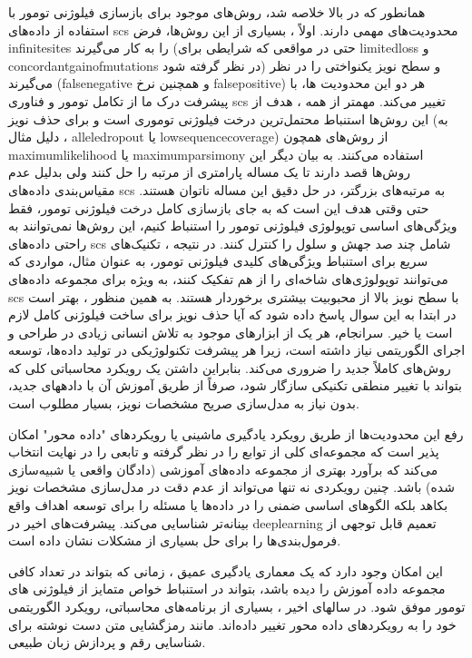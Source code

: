 همانطور که در بالا خلاصه شد، روش‌های موجود برای بازسازی فیلوژنی تومور با استفاده از داده‌های \gls{scs} محدودیت‌های مهمی دارند. اولاً ، بسیاری از این روش‌ها، فرض \gls{infinitesites} را به کار می‌گیرند (حتی در مواقعی که شرایطی برای \gls{limitedloss} و \gls{concordantgainofmutations}  در نظر گرفته شود) و سطح نویز یکنواختی را در نظر می‌گیرند (\gls{falsenegative} و همچنین نرخ \gls{falsepositive})  هر دو این محدودیت ها، با پیشرفت درک ما از تکامل تومور و فناوری \gls{scs}  تغییر می‌کند. مهمتر از همه ، هدف از این روش‌ها استنباط محتمل‌ترین درخت فیلوژنی توموری است و برای حذف نویز (به دلیل مثال ، \gls{alleledropout} یا \gls{lowsequencecoverage}) از روش‌های همچون \gls{maximumlikelihood} یا \gls{maximumparsimony} استفاده می‌کنند. به بیان دیگر این روش‌ها قصد دارند تا یک مساله پارامتری از مرتبه  را حل کنند ولی بدلیل  عدم مقیاس‌بندی داده‌های \gls{scs} به مرتبه‌های بزرگتر، در حل دقیق این مساله ناتوان هستند. حتی وقتی هدف این است که به جای بازسازی کامل درخت فیلوژنی تومور، فقط ویژگی‌های اساسی توپولوژی فیلوژنی تومور را استنباط کنیم، این روش‌ها نمی‌توانند به راحتی داده‌های \gls{scs} شامل چند صد جهش و سلول را کنترل کنند. در نتیجه ، تکنیک‌های سریع برای استنباط ویژگی‌های کلیدی فیلوژنی تومور، به عنوان مثال، مواردی که می‌توانند توپولوژی‌های شاخه‌ای را از هم تفکیک کنند، به ویژه برای مجموعه داده‌های \gls{scs} با سطح نویز بالا از محبوبیت بیشتری برخوردار هستند. به همین منظور ، بهتر است در ابتدا به این سوال پاسخ داده شود که آیا حذف نویز  برای ساخت فیلوژنی کامل لازم است یا خیر. سرانجام، هر یک از ابزارهای موجود به تلاش انسانی زیادی در طراحی و اجرای الگوریتمی نیاز داشته است، زیرا هر پیشرفت تکنولوژیکی در تولید داده‌ها، توسعه روش‌های کاملاً جدید را ضروری می‌کند. بنابراین داشتن یک رویکرد محاسباتی کلی که بتواند با تغییر منطقی تکنیکی سازگار شود، صرفاً از طریق آموزش آن با دادههای جدید، بدون نیاز به مدل‌سازی صریح مشخصات نویز، بسیار مطلوب است.


رفع این محدودیت‌ها از طریق رویکرد یادگیری ماشینی یا رویکردهای "داده محور" امکان پذیر است که مجموعه‌ای کلی از توابع را در نظر گرفته و تابعی را در نهایت انتخاب می‌کند که برآورد بهتری از مجموعه داده‌های آموزشی (دادگان واقعی یا شبیه‌سازی شده) باشد. چنین رویکردی نه تنها می‌تواند از عدم دقت در مدل‌سازی مشخصات نویز بکاهد بلکه الگوهای اساسی ضمنی را در داده‌ها یا مسئله را برای توسعه اهداف واقع بینانه‌تر شناسایی می‌کند. پیشرفت‌های اخیر در \gls{deeplearning} تعمیم قابل توجهی از فرمول‌بندی‌ها را برای حل بسیاری از مشکلات نشان داده است. \cite{silver2017mastering, devlin2018bert, liu2019roberta}

این امکان وجود دارد که یک معماری یادگیری عمیق ، زمانی که بتواند در تعداد کافی مجموعه داده آموزش را دیده باشد، بتواند در استنباط خواص متمایز از فیلوژنی های تومور موفق شود.  در سالهای اخیر ، بسیاری از برنامه‌های محاسباتی، رویکرد الگوریتمی خود را به رویکردهای داده محور تغییر داده‌اند. مانند رمزگشایی متن دست نوشته برای شناسایی رقم \cite{ciregan2012multi} و پردازش زبان طبیعی. \cite{devlin2018bert}

